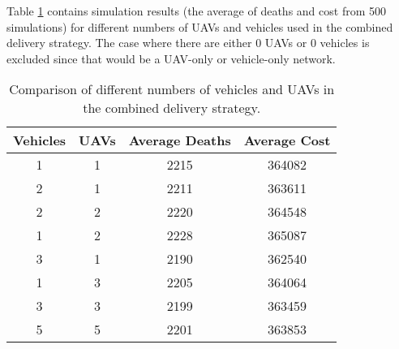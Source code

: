 \begin{table}[ht!]
\centering
{}
\caption{Average deaths and cost of different strategy pairs for a combined delivery network.}
\label{tab:Combined_stratPairs}
\end{table}

Table \ref{tab:combiSims} contains simulation results (the average of deaths and cost from 500 simulations) for different numbers of UAVs and vehicles used in the combined delivery strategy. The case where there are either 0 UAVs or 0 vehicles is excluded since that would be a UAV-only or vehicle-only network.

\begin{table}[t!]
\centering
\begin{tabular}{|c|c|c|c|}
\hline
\multicolumn{1}{|c|}{Vehicles} & UAVs & \multicolumn{1}{c|}{Average Deaths} & Average Cost \\ \hline
1 & 1 & 2215 & 364082 \\
2 & 1 & 2211 & 363611 \\
2 & 2 & 2220 & 364548 \\
1 & 2 & 2228 & 365087 \\
3 & 1 & 2190 & 362540 \\
1 & 3 & 2205 & 364064 \\
3 & 3 & 2199 & 363459 \\
5 & 5 & 2201 & 363853 \\ \hline
\end{tabular}%

\caption{Comparison of different numbers of vehicles and UAVs in the combined delivery strategy.}
\label{tab:combiSims}
\end{table}